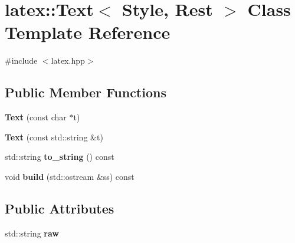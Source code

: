 \hypertarget{classlatex_1_1Text}{\section{latex\-:\-:Text$<$ Style, Rest $>$ Class Template Reference}
\label{classlatex_1_1Text}
}


{\ttfamily \#include $<$latex.\-hpp$>$}

\subsection*{Public Member Functions}
\begin{DoxyCompactItemize}
\item 
\hypertarget{classlatex_1_1Text_afe9f1b26a15e3d07ea75fb7d2fdc37bf}{{\bfseries Text} (const char $\ast$t)}\label{classlatex_1_1Text_afe9f1b26a15e3d07ea75fb7d2fdc37bf}

\item 
\hypertarget{classlatex_1_1Text_a617a65619f99319223508f56196f70a9}{{\bfseries Text} (const std\-::string \&t)}\label{classlatex_1_1Text_a617a65619f99319223508f56196f70a9}

\item 
\hypertarget{classlatex_1_1Text_ad89a6dfcc88b97508b361374b626e8f7}{std\-::string {\bfseries to\-\_\-string} () const }\label{classlatex_1_1Text_ad89a6dfcc88b97508b361374b626e8f7}

\item 
\hypertarget{classlatex_1_1Text_a5dcf86d02179aecc27f9fe02894e8c9e}{void {\bfseries build} (std\-::ostream \&ss) const }\label{classlatex_1_1Text_a5dcf86d02179aecc27f9fe02894e8c9e}

\end{DoxyCompactItemize}
\subsection*{Public Attributes}
\begin{DoxyCompactItemize}
\item 
\hypertarget{classlatex_1_1Text_a1411dbdc106553fcf930dcd3bcbb48f1}{std\-::string {\bfseries raw}}\label{classlatex_1_1Text_a1411dbdc106553fcf930dcd3bcbb48f1}

\end{DoxyCompactItemize}
